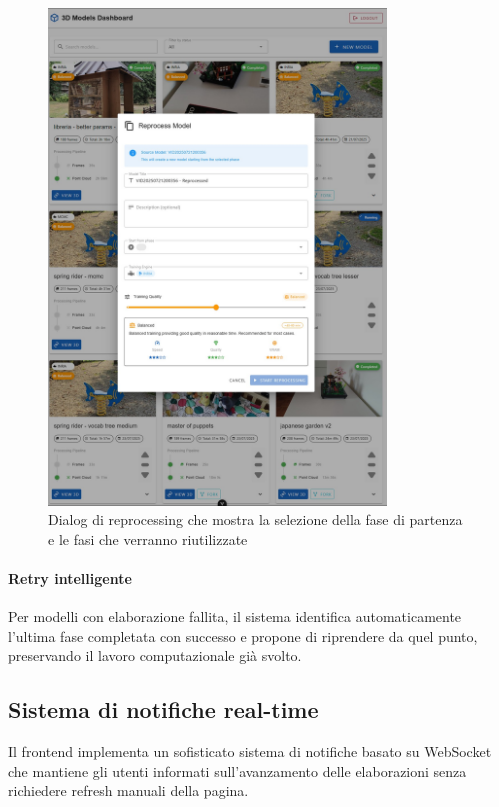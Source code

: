 \begin{figure}[htbp]
	\centering
	\includegraphics[width=0.8\textwidth]{images/frontend_fork.jpg}
	\caption{Dialog di reprocessing che mostra la selezione della fase di partenza e le fasi che verranno riutilizzate}
	\label{fig:fork_dialog}
\end{figure}

\paragraph{Retry intelligente}
Per modelli con elaborazione fallita, il sistema identifica automaticamente l'ultima fase completata con successo e propone di riprendere da quel punto, preservando il lavoro computazionale già svolto.

\subsection{Sistema di notifiche real-time}

Il frontend implementa un sofisticato sistema di notifiche basato su WebSocket che mantiene gli utenti informati sull'avanzamento delle elaborazioni senza richiedere refresh manuali della pagina.


